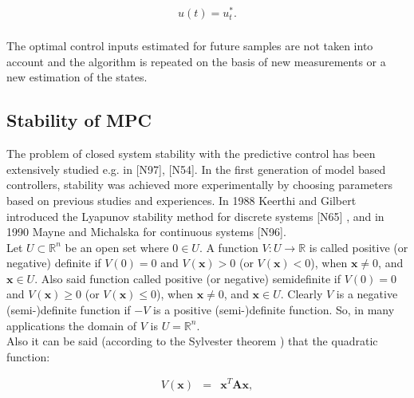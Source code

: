 		\begin{equation}
        \begin{array}{rcl}
				u(t)=u^*_t.\\
        \end{array}
        \label{BASICMPC:equ:receiding_optimal_first}
    \end{equation}
		
		The optimal control inputs estimated for future samples are not taken into account and the algorithm is
repeated on the basis of new measurements or a new estimation of the states.

\subsection{Stability of MPC}\label{BASICCSR:sec:MPCStability}		

	The problem of closed system stability with the predictive control has been extensively studied e.g. in [N97], [N54]. In the first generation of model based controllers, stability was achieved more experimentally by choosing parameters based on previous studies and experiences. In 1988 Keerthi and Gilbert introduced the Lyapunov stability method for discrete systems [N65] , and in 1990 Mayne and Michalska for continuous systems [N96]. \\
	Let $U\subset\mathbb{R}^n$ be an open set where $0\in U$. A function $V:U\longrightarrow\mathbb{R}$ is called positive (or negative) definite if $V(0)=0$ and $V(\boldsymbol{x})>0$ (or $V(\boldsymbol{x})<0$), when $\boldsymbol{x}\neq0$, and $\boldsymbol{x}\in U$. Also said function called positive (or negative) semidefinite if $V(0)=0$ and $V(\boldsymbol{x})\geq 0$ (or $V(\boldsymbol{x})\leq 0$), when $\boldsymbol{x}\neq 0$, and $\boldsymbol{x}\in U$. Clearly $V$ is a negative (semi-)definite function if $-V$ is a positive (semi-)definite function. So, in many applications the domain of $V$ is $U=\mathbb{R}^n$.\\
	Also it can be said (according to the Sylvester theorem \cite{horn2012matrix}) that the quadratic function:
	
	\begin{equation}
        \begin{array}{rcl}
				V(\boldsymbol{x})&=&\boldsymbol{x}^T\boldsymbol{A}\boldsymbol{x},\\
        \end{array}
        \label{BASICMPC:equ:LyapunovTheory_0}
    \end{equation}
	
